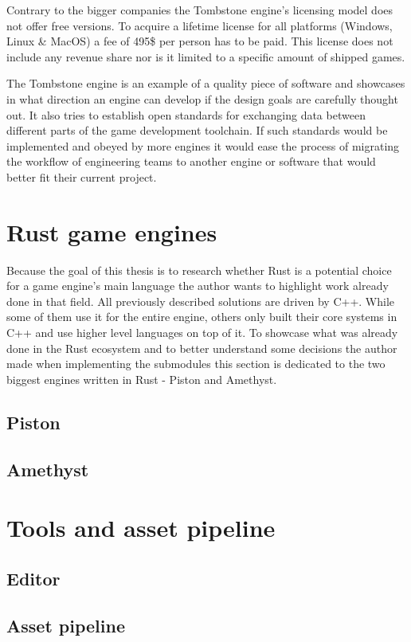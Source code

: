 Contrary to the bigger companies the Tombstone engine's licensing model does not offer free versions. To acquire a lifetime license for all platforms (Windows, Linux \& MacOS) a fee of 495\$ per person has to be paid. This license does not include any revenue share nor is it limited to a specific amount of shipped games.

The Tombstone engine is an example of a quality piece of software and showcases in what direction an engine can develop if the design goals are carefully thought out. It also tries to establish open standards for exchanging data between different parts of the game development toolchain. If such standards would be implemented and obeyed by more engines it would ease the process of migrating the workflow of engineering teams to another engine or software that would better fit their current project.

\section{Rust game engines}

Because the goal of this thesis is to research whether Rust is a potential choice for a game engine's main language the author wants to highlight work already done in that field. All previously described solutions are driven by C++. While some of them use it for the entire engine, others only built their core systems in C++ and use higher level languages on top of it. To showcase what was already done in the Rust ecosystem and to better understand some decisions the author made when implementing the submodules this section is dedicated to the two biggest engines written in Rust - Piston and Amethyst.

\subsection{Piston}
\blindtext
\subsection{Amethyst}
\blindtext
\section{Tools and asset pipeline}
\blindtext
\subsection{Editor}
\blindtext
\subsection{Asset pipeline}
\blindtext
